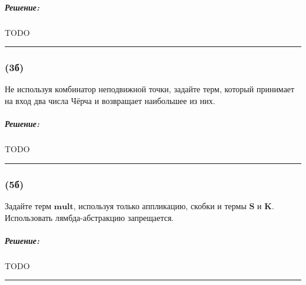 \documentclass{article}
\newenvironment{proof}{\subparagraph{\hspace{-1em}Решение:\newline}}{\par\noindent\rule{\textwidth}{0.4pt}}
\begin{document}
    \begin{proof}
        TODO %
    \end{proof}

    \subsubsection{(3б)}

    Не используя комбинатор неподвижной точки, задайте терм, который
    принимает на вход два числа Чёрча и возвращает наибольшее из них.

    \begin{proof}
        TODO %
    \end{proof}

    \subsubsection{(5б)}

    Задайте терм $\mathbf{mult}$, используя только аппликацию, скобки и
    термы $\mathbf{S}$ и $\mathbf{K}$. Использовать лямбда-абстракцию
    запрещается.

    \begin{proof}
        TODO %
    \end{proof}
\end{document}

